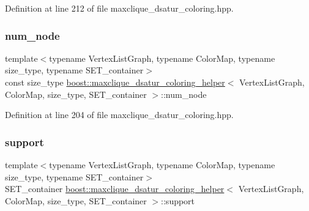 Definition at line 212 of file maxclique\+\_\+dsatur\+\_\+coloring.\+hpp.

\mbox{\label{classboost_1_1maxclique__dsatur__coloring__helper_a633bc42872ba1e8c51ae97b4ca092e92}} 
\subsubsection{\texorpdfstring{num\+\_\+node}{num\_node}}
{\footnotesize\ttfamily template$<$typename Vertex\+List\+Graph, typename Color\+Map, typename size\+\_\+type, typename S\+E\+T\+\_\+container$>$ \\
const size\+\_\+type \hyperlink{classboost_1_1maxclique__dsatur__coloring__helper}{boost\+::maxclique\+\_\+dsatur\+\_\+coloring\+\_\+helper}$<$ Vertex\+List\+Graph, Color\+Map, size\+\_\+type, S\+E\+T\+\_\+container $>$\+::num\+\_\+node\hspace{0.3cm}{\ttfamily [private]}}



Definition at line 204 of file maxclique\+\_\+dsatur\+\_\+coloring.\+hpp.

\mbox{\label{classboost_1_1maxclique__dsatur__coloring__helper_afb8bc7c39aeb0b0437ca58228b6b7cae}} 
\subsubsection{\texorpdfstring{support}{support}}
{\footnotesize\ttfamily template$<$typename Vertex\+List\+Graph, typename Color\+Map, typename size\+\_\+type, typename S\+E\+T\+\_\+container$>$ \\
S\+E\+T\+\_\+container \hyperlink{classboost_1_1maxclique__dsatur__coloring__helper}{boost\+::maxclique\+\_\+dsatur\+\_\+coloring\+\_\+helper}$<$ Vertex\+List\+Graph, Color\+Map, size\+\_\+type, S\+E\+T\+\_\+container $>$\+::support\hspace{0.3cm}{\ttfamily [private]}}



